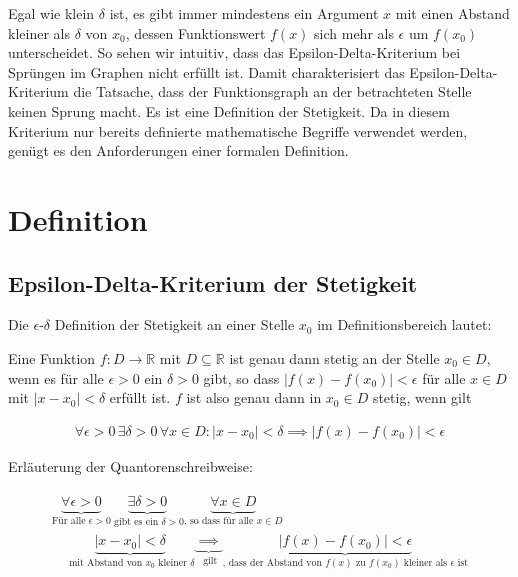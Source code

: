 \documentclass[fontsize=9pt,
               parskip=half-,
               DIV=14,
               listof=chapterentry,
               tocflat]{scrbook}
\begin{document}
Egal wie klein $\delta $ ist, es gibt immer mindestens ein Argument $x$ mit einen Abstand kleiner als $\delta $ von $x_{0}$, dessen Funktionswert $f(x)$ sich mehr als $\epsilon $ um $f(x_{0})$ unterscheidet. So sehen wir intuitiv, dass das Epsilon-Delta-Kriterium bei Sprüngen im Graphen nicht erfüllt ist. Damit charakterisiert das Epsilon-Delta-Kriterium die Tatsache, dass der Funktionsgraph an der betrachteten Stelle keinen Sprung macht. Es ist eine Definition der Stetigkeit. Da in diesem Kriterium nur bereits definierte mathematische Begriffe verwendet werden, genügt es den Anforderungen einer formalen Definition.

\section{Definition}

\subsection{Epsilon-Delta-Kriterium der Stetigkeit}

Die $\epsilon $-$\delta $ Definition der Stetigkeit an einer Stelle $x_{0}$ im Definitionsbereich lautet:



\begin{definition*}
Eine Funktion $f:D\to \mathbb {R} $ mit $D\subseteq \mathbb {R} $ ist genau dann stetig an der Stelle $x_{0}\in D$, wenn es für alle $\epsilon >0$ ein $\delta >0$ gibt, so dass $|f(x)-f(x_{0})|<\epsilon $ für alle $x\in D$ mit $|x-x_{0}|<\delta $ erfüllt ist. $f$ ist also genau dann in $x_{0}\in D$ stetig, wenn gilt

\begin{align*}
\forall \epsilon >0\,\exists \delta >0\,\forall x\in D:|x-x_{0}|<\delta \implies |f(x)-f(x_{0})|<\epsilon 
\end{align*}

\end{definition*}



Erläuterung der Quantorenschreibweise:

\begin{align*}
{\begin{array}{l}\underbrace {{\underset {}{}}\forall \epsilon >0} _{{\text{Für alle }}\epsilon >0}\underbrace {{\underset {}{}}\exists \delta >0} _{{\text{ gibt es ein }}\delta >0}\underbrace {{\underset {}{}}\forall x\in D} _{{\text{, so dass für alle }}x\in D}\\[1em]\quad \underbrace {{\underset {}{}}|x-x_{0}|<\delta } _{{\text{ mit Abstand von }}x_{0}{\text{ kleiner }}\delta }\underbrace {{\underset {}{}}\implies } _{\text{ gilt}}\underbrace {{\underset {}{}}|f(x)-f(x_{0})|<\epsilon } _{{\text{, dass der Abstand von }}f(x){\text{ zu }}f(x_{0}){\text{ kleiner als }}\epsilon {\text{ ist}}}\end{array}}
\end{align*}
\end{document}
